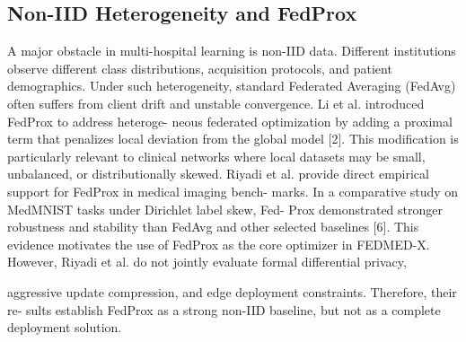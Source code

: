 \subsection{Non-IID Heterogeneity and FedProx}
A major obstacle in multi-hospital learning is non-IID data.
Different institutions observe different class distributions, acquisition protocols, and patient demographics.
Under such heterogeneity, standard Federated Averaging (FedAvg) often suffers from client drift and unstable convergence. Li et al. introduced FedProx to address heteroge- neous federated optimization by adding a proximal term that penalizes local deviation from the global model [2]. This modification is particularly relevant to clinical networks where local datasets may be small, unbalanced, or distributionally skewed.
Riyadi et al. provide direct empirical support for FedProx in medical imaging bench- marks. In a comparative study on MedMNIST tasks under Dirichlet label skew, Fed-
Prox demonstrated stronger robustness and stability than FedAvg and other selected baselines [6].
This evidence motivates the use of FedProx as the core optimizer in
FEDMED-X. However, Riyadi et al. do not jointly evaluate formal differential privacy,

aggressive update compression, and edge deployment constraints. Therefore, their re- sults establish FedProx as a strong non-IID baseline, but not as a complete deployment solution.
